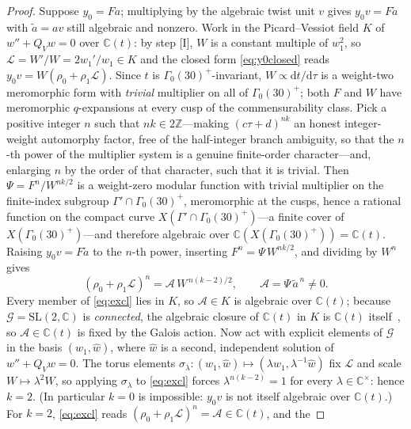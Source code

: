 \documentclass[cntp]{ipart}
\newcommand{\rmd}{\mathrm{d}}
\theoremstyle{plain}
\theoremstyle{remark}
\begin{document}
\begin{proof}
Suppose $y_0=Fa$; multiplying by the algebraic twist unit $v$ gives
$y_0v=F\tilde a$ with $\tilde a=av$ still algebraic and nonzero. Work in the Picard--Vessiot
field $K$ of $w''+Q_Vw=0$ over $\mathbb{C}(t)$: by step [I], $W$ is a constant multiple of
$w_1^2$, so $\mathcal{L}=W'/W=2w_1'/w_1\in K$ and the closed form \eqref{eq:y0closed} reads
$y_0v=W(\rho_0+\rho_1\mathcal{L})$. Since $t$ is $\Gamma_0(30)^+$-invariant,
$W\propto\rmd t/\rmd\tau$ is a weight-two meromorphic form with \emph{trivial} multiplier on
all of $\Gamma_0(30)^+$; both $F$ and $W$ have meromorphic $q$-expansions at every cusp of the
commensurability class. Pick a positive integer $n$ such that $nk\in2\mathbb{Z}$---making
$(c\tau+d)^{nk}$ an honest integer-weight automorphy factor, free of the half-integer branch
ambiguity, so that the $n$-th power of the multiplier system is a genuine finite-order
character---and, enlarging $n$ by the order of that character, such that it is trivial. Then
$\Psi=F^n/W^{nk/2}$ is a weight-zero modular function with trivial
multiplier on the finite-index subgroup $\Gamma'\cap\Gamma_0(30)^+$, meromorphic at the cusps,
hence a rational function on the compact curve $X(\Gamma'\cap\Gamma_0(30)^+)$---a finite cover
of $X(\Gamma_0(30)^+)$---and therefore algebraic over
$\mathbb{C}(X(\Gamma_0(30)^+))=\mathbb{C}(t)$. Raising $y_0v=F\tilde a$ to the $n$-th power,
inserting $F^n=\Psi\,W^{nk/2}$, and dividing by $W^n$ gives
\begin{equation}
(\rho_0+\rho_1\mathcal{L})^n=\mathcal{A}\,W^{\,n(k-2)/2},\qquad
\mathcal{A}=\Psi\,\tilde a^{\,n}\neq0.
\label{eq:excl}
\end{equation}
Every member of \eqref{eq:excl} lies in $K$, so $\mathcal{A}\in K$ is algebraic over
$\mathbb{C}(t)$; because $\mathcal{G}=\mathrm{SL}(2,\mathbb{C})$ is \emph{connected}, the
algebraic closure of $\mathbb{C}(t)$ in $K$ is $\mathbb{C}(t)$ itself~\cite{vdPutSinger}, so
$\mathcal{A}\in\mathbb{C}(t)$ is fixed by the Galois action. Now act with explicit elements
of $\mathcal{G}$ in the basis $(w_1,\hat w)$, where $\hat w$ is a second, independent solution of $w''+Q_Vw=0$. The torus elements
$\sigma_\lambda:(w_1,\hat w)\mapsto(\lambda w_1,\lambda^{-1}\hat w)$ fix $\mathcal{L}$ and scale
$W\mapsto\lambda^2W$, so applying $\sigma_\lambda$ to \eqref{eq:excl} forces
$\lambda^{n(k-2)}=1$ for every $\lambda\in\mathbb{C}^\times$: hence $k=2$. (In particular
$k=0$ is impossible: $y_0v$ is not itself algebraic over $\mathbb{C}(t)$.) For $k=2$,
\eqref{eq:excl} reads $(\rho_0+\rho_1\mathcal{L})^n=\mathcal{A}\in\mathbb{C}(t)$, and the

\end{proof}
\end{document}
